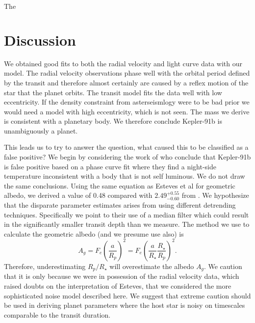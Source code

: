 \documentclass[apjl]{emulateapj}
\begin{document}
The 

\section{Discussion}
We obtained good fits to both the radial velocity and light curve data with our model. The radial velocity observations phase well with the orbital period defined by the transit and therefore almost certainly are caused by a reflex motion of the star that the planet orbits. The transit model fits the data well with low eccentricity. If the density constraint from asterseismlogy were to be bad prior we would need a model with high eccentricity, which is not seen. The mass we derive is consistent with a planetary body. We therefore conclude Kepler-91b is unambiguously a planet.

This leads us to try to answer the question, what caused this to be classified as a false positive? We begin by considering the work of \citet{esteves13} who conclude that Kepler-91b is false positive based on a phase curve fit where they find a night-side temperature inconsistent with a body that is not self luminous. We do not draw the same conclusions. Using the same equation as Esteves et al for geometric albedo, we derived a value of 0.48 compared with $2.49^{+0.55}_{-0.60}$ from \citeauthor{esteves13}. We hypothesize that the disparate parameter estimates arises from using different detrending techniques. Specifically we point to their use of a median filter which could result in the significantly smaller transit depth than we measure. The method we use to calculate the geometric albedo (and we presume \citeauthor{esteves13} use also) is
\begin{equation}
A_g = F_e \left(\frac{a}{R_p}\right)^{2} = F_e \left(\frac{a}{R_{\star}}\frac{R_{\star}}{R_{p}}\right)^{2} .
\end{equation}
Therefore, underestimating $R_{p}/R_{\star}$ will overestimate the albedo $A_g$. We caution that it is only because we were in possession of the radial velocity data, which raised doubts on the interpretation of Esteves, that we considered the more sophisticated noise model described here. We suggest that extreme caution should be used in deriving planet parameters where the host star is noisy on timescales comparable to the transit duration.
\end{document}
